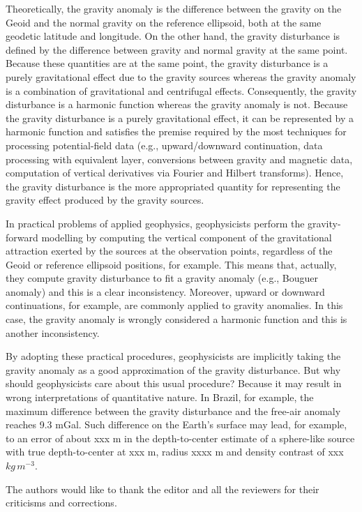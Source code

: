 \documentclass[extra]{gji}
\begin{document}
Theoretically, the gravity anomaly is the difference between the
gravity on the Geoid and the normal gravity on the reference ellipsoid,
both at the same geodetic latitude and longitude.
On the other hand, the gravity disturbance is defined by the difference
between gravity and normal gravity at the same point.
Because these quantities are at the same point, the gravity disturbance
is a purely gravitational effect due to the gravity sources whereas the
gravity anomaly is a combination of gravitational and centrifugal
effects.
Consequently, the gravity disturbance is a harmonic function whereas the
gravity anomaly is not.
Because the gravity disturbance is a purely gravitational effect, it can
be represented by a harmonic function and satisfies the premise required
by the most techniques for processing potential-field data (e.g.,
upward/downward continuation, data processing with equivalent layer,
conversions between gravity and magnetic data, computation of vertical
derivatives via Fourier and Hilbert transforms).
Hence, the gravity disturbance is the more appropriated quantity for
representing the gravity effect produced by the gravity sources.

In practical problems of applied geophysics, geophysicists perform the
gravity-forward modelling by computing the vertical component of the
gravitational attraction exerted by the sources at the observation
points, regardless of the Geoid or reference ellipsoid positions,
for example.
This means that, actually, they compute gravity disturbance to fit
a gravity anomaly (e.g., Bouguer anomaly) and this is a clear inconsistency.
Moreover, upward or downward continuations, for example, are commonly applied to
gravity anomalies. In this case, the gravity anomaly is wrongly considered a
harmonic function and this is another inconsistency.

By adopting these practical procedures, geophysicists are implicitly
taking the gravity anomaly as a good approximation of the gravity
disturbance. But why should geophysicists care about this usual
procedure? Because it may result in wrong interpretations of
quantitative nature. In Brazil, for example, the maximum difference
between the gravity disturbance and the free-air anomaly reaches 9.3
mGal. Such difference on the Earth's surface may lead, for example, to
an error of about xxx m in the depth-to-center estimate of a sphere-like
source with true depth-to-center at xxx m, radius xxxx m and density
contrast of xxx $kg \, m^{-3}$.


\begin{acknowledgments}
The authors would like to thank the editor and all the
reviewers for their criticisms and corrections.
\end{acknowledgments}
\end{document}
